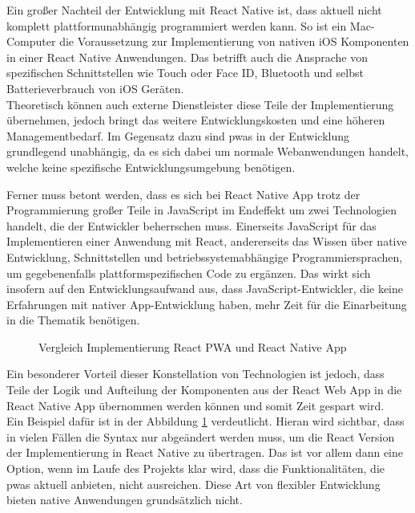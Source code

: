 Ein großer Nachteil der Entwicklung mit React Native ist, dass aktuell nicht komplett plattformunabhängig programmiert werden kann.
So ist ein Mac-Computer die Voraussetzung zur Implementierung von nativen iOS Komponenten in einer React Native Anwendungen.%
Das betrifft auch die Ansprache von spezifischen Schnittstellen wie Touch oder Face ID, Bluetooth und selbst Batterieverbrauch von iOS Geräten.\\
Theoretisch können auch externe Dienstleister diese Teile der Implementierung übernehmen, jedoch bringt das weitere Entwicklungskosten und eine höheren Managementbedarf.
Im Gegensatz dazu sind \acp{pwa} in der Entwicklung grundlegend unabhängig, da es sich dabei um normale Webanwendungen handelt, welche keine spezifische Entwicklungsumgebung benötigen.

Ferner muss betont werden, dass es sich bei React Native App trotz der Programmierung großer Teile in JavaScript im Endeffekt um zwei Technologien handelt, die der Entwickler beherrschen muss.
Einerseits JavaScript für das Implementieren einer Anwendung mit React, andererseits das Wissen über native Entwicklung, Schnittstellen und betriebssystemabhängige Programmiersprachen, um gegebenenfalls plattformspezifischen Code zu ergänzen.
Das wirkt sich insofern auf den Entwicklungsaufwand aus, dass JavaScript-Entwickler, die keine Erfahrungen mit nativer App-Entwicklung haben, mehr Zeit für die Einarbeitung in die Thematik benötigen.

\begin{figure}
\caption{Vergleich Implementierung React PWA und React Native App}
\label{fig:textinputComparison}
\end{figure}

Ein besonderer Vorteil dieser Konstellation von Technologien ist jedoch, dass Teile der Logik und Aufteilung der Komponenten aus der React Web App in die React Native App übernommen werden können und somit Zeit gespart wird.\\
Ein Beispiel dafür ist in der Abbildung \ref{fig:textinputComparison} verdeutlicht.
Hieran wird sichtbar, dass in vielen Fällen die Syntax nur abgeändert werden muss, um die React Version der Implementierung in React Native zu übertragen.
Das ist vor allem dann eine Option, wenn im Laufe des Projekts klar wird, dass die Funktionalitäten, die \acp{pwa} aktuell anbieten, nicht ausreichen.
Diese Art von flexibler Entwicklung bieten native Anwendungen grundsätzlich nicht.


